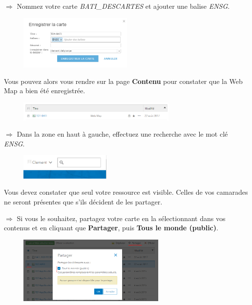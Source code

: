 \documentclass[11pt]{article}
\newcommand{\action}{$\Rightarrow$ }
\begin{document}
\action Nommez votre carte \textit{BATI\_DESCARTES} et ajouter une balise \textit{ENSG}.
\begin{figure}[H]
	\center \includegraphics[width=0.5\textwidth]{img/cours3/ago_enregistrer_carte-2.png} \\
\end{figure}

Vous pouvez alors vous rendre sur la page \textbf{Contenu} pour constater que la Web Map a bien été enregistrée.
\begin{figure}[H]
	\center \includegraphics[width=0.7\textwidth]{img/cours3/ago_web_map_ok.png} \\
\end{figure}

\action Dans la zone en haut à gauche, effectuez une recherche avec le mot clé \textit{ENSG}.
\begin{figure}[H]
	\center \includegraphics[width=0.4\textwidth]{img/cours3/ago_recherche.png} \\
\end{figure}

Vous devez constater que seul votre ressource est visible. Celles de vos camarades ne seront présentes que s'ils décident de les partager.

\action Si vous le souhaitez, partagez votre carte en la sélectionnant dans vos contenus et en cliquant que \textbf{Partager}, puis \textbf{Tous le monde (public)}.
\begin{figure}[H]
	\center \includegraphics[width=0.65\textwidth]{img/cours3/ago_partager_carte.png} \\
\end{figure}
\end{document}

